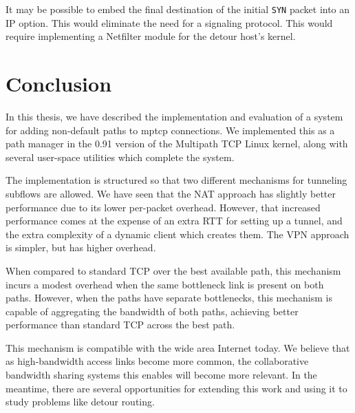 \documentclass{cwru}
\begin{document}
It may be possible to embed the final destination of the initial \texttt{SYN}
packet into an IP option. This would eliminate the need for a signaling
protocol. This would require implementing a Netfilter module for the detour
host's kernel.

\chapter{Conclusion}
\label{c:conclusion}

In this thesis, we have described the implementation and evaluation of a system
for adding non-default paths to \ac{mptcp} connections. We implemented this as a
path manager in the 0.91 version of the Multipath TCP Linux kernel, along with
several user-space utilities which complete the system.

The implementation is structured so that two different mechanisms for tunneling
subflows are allowed. We have seen that the NAT approach has slightly better
performance due to its lower per-packet overhead. However, that increased
performance comes at the expense of an extra RTT for setting up a tunnel, and
the extra complexity of a dynamic client which creates them. The VPN approach is
simpler, but has higher overhead.

When compared to standard TCP over the best available path, this mechanism
incurs a modest overhead when the same bottleneck link is present on both paths.
However, when the paths have separate bottlenecks, this mechanism is capable of
aggregating the bandwidth of both paths, achieving better performance than
standard TCP across the best path.

This mechanism is compatible with the wide area Internet today. We believe that
as high-bandwidth access links become more common, the collaborative bandwidth
sharing systems this enables will become more relevant. In the meantime, there
are several opportunities for extending this work and using it to study problems
like detour routing.

\backmatter
\appendix



\end{document}
